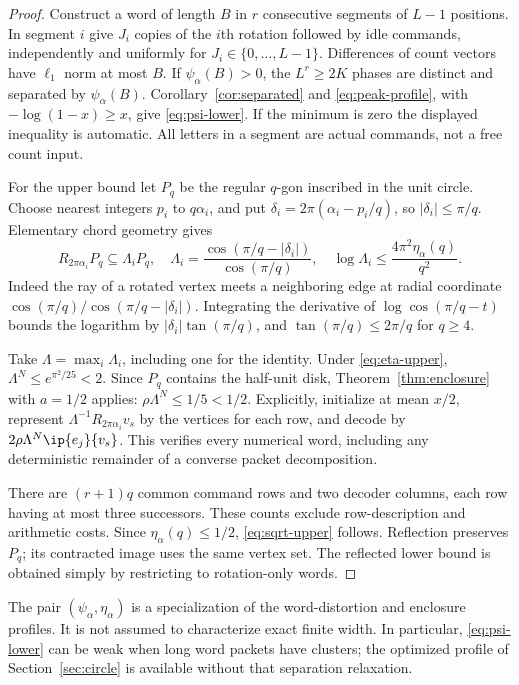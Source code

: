 \begin{proof}
Construct a word of length $B$ in $r$ consecutive segments of $L-1$ positions. In segment $i$ give $J_i$ copies of the $i$th rotation followed by idle commands, independently and uniformly for $J_i\in\{0,\ldots,L-1\}$. Differences of count vectors have $\ell_1$ norm at most $B$. If $\psi_\alpha(B)>0$, the $L^r\ge2K$ phases are distinct and separated by $\psi_\alpha(B)$. Corollary~\ref{cor:separated} and \eqref{eq:peak-profile}, with $-\log(1-x)\ge x$, give \eqref{eq:psi-lower}. If the minimum is zero the displayed inequality is automatic. All letters in a segment are actual commands, not a free count input.

For the upper bound let $P_q$ be the regular $q$-gon inscribed in the unit circle. Choose nearest integers $p_i$ to $q\alpha_i$, and put $\delta_i=2\pi(\alpha_i-p_i/q)$, so $|\delta_i|\le\pi/q$. Elementary chord geometry gives
\begin{equation}\label{eq:dilation}
 R_{2\pi\alpha_i}P_q\subseteq\Lambda_iP_q,
 \quad
 \Lambda_i=\frac{\cos(\pi/q-|\delta_i|)}{\cos(\pi/q)},
 \quad
 \log\Lambda_i\le\frac{4\pi^2\eta_\alpha(q)}{q^2}.
\end{equation}
Indeed the ray of a rotated vertex meets a neighboring edge at radial coordinate $\cos(\pi/q)/\cos(\pi/q-|\delta_i|)$. Integrating the derivative of $\log\cos(\pi/q-t)$ bounds the logarithm by $|\delta_i|\tan(\pi/q)$, and $\tan(\pi/q)\le2\pi/q$ for $q\ge4$.

Take $\Lambda=\max_i\Lambda_i$, including one for the identity. Under \eqref{eq:eta-upper}, $\Lambda^N\le e^{\pi^2/25}<2$. Since $P_q$ contains the half-unit disk, Theorem~\ref{thm:enclosure} with $a=1/2$ applies: $\rho\Lambda^N\le1/5<1/2$. Explicitly, initialize at mean $x/2$, represent $\Lambda^{-1}R_{2\pi\alpha_i}v_s$ by the vertices for each row, and decode by $2\rho\Lambda^N\ip{e_j}{v_s}$. This verifies every numerical word, including any deterministic remainder of a converse packet decomposition.

There are $(r+1)q$ common command rows and two decoder columns, each row having at most three successors. These counts exclude row-description and arithmetic costs. Since $\eta_\alpha(q)\le1/2$, \eqref{eq:sqrt-upper} follows. Reflection preserves $P_q$; its contracted image uses the same vertex set. The reflected lower bound is obtained simply by restricting to rotation-only words.
\end{proof}

The pair $(\psi_\alpha,\eta_\alpha)$ is a specialization of the word-distortion and enclosure profiles. It is not assumed to characterize exact finite width. In particular, \eqref{eq:psi-lower} can be weak when long word packets have clusters; the optimized profile of Section~\ref{sec:circle} is available without that separation relaxation.

